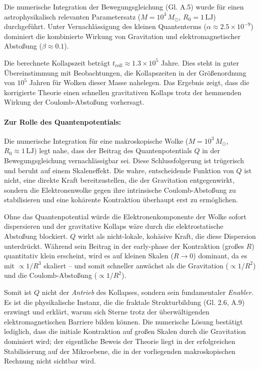 Die numerische Integration der Bewegungsgleichung (Gl. A.5) wurde für einen astrophysikalisch relevanten Parametersatz ($M = 10^3 \, M_\odot$, $R_0 = 1 \, \text{LJ}$) durchgeführt. Unter Vernachlässigung
des kleinen Quantenterms ($\alpha \approx 2.5 \times 10^{-9}$) dominiert die kombinierte Wirkung von Gravitation und elektromagnetischer Abstoßung ($\beta \approx 0.1$).

Die berechnete Kollapszeit beträgt $t_{\text{coll}} \approx 1.3 \times 10^5$ Jahre. Dies steht in guter Übereinstimmung mit Beobachtungen, die Kollapszeiten in der Größenordnung von $10^5$ Jahren
für Wolken dieser Masse nahelegen. Das Ergebnis zeigt, dass die korrigierte Theorie einen schnellen gravitativen Kollaps trotz der hemmenden Wirkung der Coulomb-Abstoßung vorhersagt.

\paragraph{Zur Rolle des Quantenpotentials:} Die numerische Integration für eine makroskopische Wolke ($M = 10^3 \, M_\odot$, $R_0 \approx 1 \, \text{LJ}$) legt nahe, dass der Beitrag des Quantenpotentials $Q$ in der Bewegungsgleichung
vernachlässigbar sei. Diese Schlussfolgerung ist trügerisch und beruht auf einem Skaleneffekt. Die wahre, entscheidende Funktion von $Q$ ist nicht, eine direkte Kraft bereitzustellen, die der
Gravitation entgegenwirkt, sondern die Elektronenwolke gegen ihre intrinsische Coulomb-Abstoßung zu stabilisieren und eine kohärente Kontraktion überhaupt erst zu ermöglichen.

Ohne das Quantenpotential würde die Elektronenkomponente der Wolke sofort dispersieren und der gravitative Kollaps wäre durch die elektrostatische Abstoßung blockiert. $Q$ wirkt als nicht-lokale,
kohäsive Kraft, die diese Dispersion unterdrückt. Während sein Beitrag in der early-phase der Kontraktion (großes $R$) quantitativ klein erscheint, wird es auf kleinen Skalen ($R \to 0$) dominant,
da es mit $\propto 1/R^3$ skaliert – und somit schneller anwächst als die Gravitation ($\propto 1/R^2$) und die Coulomb-Abstoßung ($\propto 1/R^2$). 

Somit ist $Q$ nicht der \textit{Antrieb} des Kollapses, sondern sein fundamentaler \textit{Enabler}. Es ist die physikalische Instanz, die die fraktale Strukturbildung (Gl. 2.6, A.9) erzwingt und
erklärt, warum sich Sterne trotz der überwältigenden elektromagnetischen Barriere bilden können. Die numerische Lösung bestätigt lediglich, dass die initiale Kontraktion auf großen Skalen durch
die Gravitation dominiert wird; der eigentliche Beweis der Theorie liegt in der erfolgreichen Stabilisierung auf der Mikroebene, die in der vorliegenden makroskopischen Rechnung nicht sichtbar wird.

